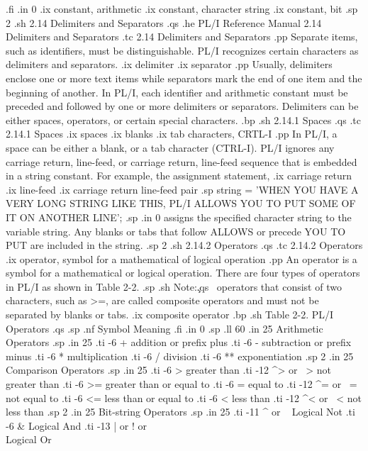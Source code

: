 .fi
.in 0
.ix constant, arithmetic
.ix constant, character string
.ix constant, bit
.sp 2
.sh
2.14  Delimiters and Separators
.qs
.he PL/I Reference Manual             2.14  Delimiters and Separators
.tc    2.14  Delimiters and Separators
.pp
Separate items, such as identifiers, must be distinguishable.  PL/I recognizes 
certain characters as delimiters and separators.  
.ix delimiter 
.ix separator
.pp
Usually, delimiters enclose one or more text items while separators mark the 
end of one item and the beginning of another.  In PL/I, each identifier and
arithmetic constant must be preceded and followed by one or more delimiters or 
separators.  Delimiters can be either spaces, operators, or certain special 
characters.
.bp
.sh
2.14.1  Spaces
.qs
.tc         2.14.1  Spaces
.ix spaces
.ix blanks
.ix tab characters, CRTL-I
.pp
In PL/I, a space can be either a blank, or a tab character (CTRL-I).  PL/I 
ignores any carriage return, line-feed, or carriage return, line-feed sequence 
that is embedded in a string constant.  For example, the assignment statement,
.ix carriage return
.ix line-feed
.ix carriage return line-feed pair
.sp
string = 'WHEN YOU HAVE A VERY LONG STRING LIKE THIS, PL/I
ALLOWS YOU TO PUT SOME OF IT ON ANOTHER LINE';
.sp
.in 0
assigns the specified character string to the variable string.  Any blanks or 
tabs that follow ALLOWS or precede YOU TO PUT are included in the string. 
.sp 2
.sh
2.14.2  Operators
.qs
.tc         2.14.2  Operators
.ix operator, symbol for a mathematical of logical operation 
.pp
An operator is a symbol for a mathematical or logical operation.  There are 
four types of operators in PL/I as shown in Table 2-2.
.sp
.sh
Note:\c
.qs
\  operators that consist of two characters, such as >=, are called composite 
operators and must not be separated by blanks or tabs.
.ix composite operator
.bp
.sh
                  Table 2-2.  PL/I Operators
.qs
.sp
.nf
              Symbol              Meaning    
.fi
.in 0
.sp
.ll 60
.in 25
Arithmetic Operators
.sp
.in 25
.ti -6
+     addition or prefix plus
.ti -6
-     subtraction or prefix minus
.ti -6
*     multiplication
.ti -6
/     division
.ti -6
**    exponentiation
.sp 2
.in 25
Comparison Operators
.sp
.in 25
.ti -6
>     greater than
.ti -12
^> or ~>    not greater than
.ti -6
>=    greater than or equal to
.ti -6
=     equal to
.ti -12
^= or ~=    not equal to
.ti -6
<=    less than or equal to
.ti -6
<     less than
.ti -12
^< or ~<    not less than
.sp 2
.in 25
Bit-string Operators 
.sp
.in 25
.ti -11
^ or ~     Logical Not
.ti -6
&     Logical And
.ti -13
| or ! or \\  Logical Or
